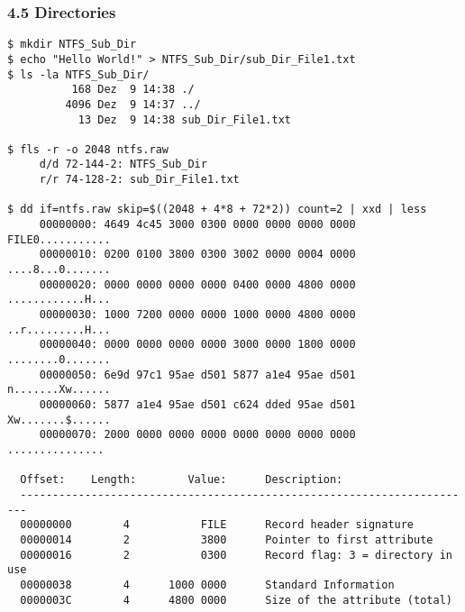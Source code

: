 \begin{frame}[fragile]
  \frametitle{4.5 Directories}
  \begin{lstlisting}[basicstyle=\tiny]
$ mkdir NTFS_Sub_Dir
$ echo "Hello World!" > NTFS_Sub_Dir/sub_Dir_File1.txt
$ ls -la NTFS_Sub_Dir/
          168 Dez  9 14:38 ./
         4096 Dez  9 14:37 ../
           13 Dez  9 14:38 sub_Dir_File1.txt

$ fls -r -o 2048 ntfs.raw
     d/d 72-144-2: NTFS_Sub_Dir
     r/r 74-128-2: sub_Dir_File1.txt

$ dd if=ntfs.raw skip=$((2048 + 4*8 + 72*2)) count=2 | xxd | less
     00000000: 4649 4c45 3000 0300 0000 0000 0000 0000  FILE0...........
     00000010: 0200 0100 3800 0300 3002 0000 0004 0000  ....8...0.......
     00000020: 0000 0000 0000 0000 0400 0000 4800 0000  ............H...
     00000030: 1000 7200 0000 0000 1000 0000 4800 0000  ..r.........H...
     00000040: 0000 0000 0000 0000 3000 0000 1800 0000  ........0.......
     00000050: 6e9d 97c1 95ae d501 5877 a1e4 95ae d501  n.......Xw......
     00000060: 5877 a1e4 95ae d501 c624 dded 95ae d501  Xw.......$......
     00000070: 2000 0000 0000 0000 0000 0000 0000 0000   ...............
  
  Offset:    Length:        Value:      Description:
  -----------------------------------------------------------------------
  00000000        4           FILE      Record header signature
  00000014        2           3800      Pointer to first attribute
  00000016        2           0300      Record flag: 3 = directory in use
  00000038        4      1000 0000      Standard Information
  0000003C        4      4800 0000      Size of the attribute (total)
  \end{lstlisting}
\end{frame}


